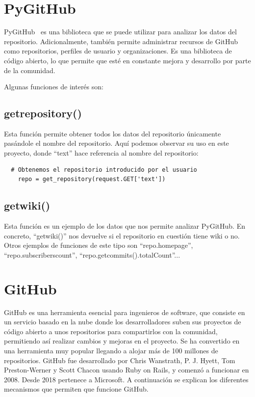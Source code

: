 \documentclass[a4paper, 12pt]{book}
\begin{document}
\section{PyGitHub}
\label{sec:pygithub}

PyGitHub~\cite{website:Pygithub} es una biblioteca que se puede utilizar para analizar los datos del repositorio. Adicionalmente, también permite administrar recursos de GitHub como repositorios, perfiles de usuario y organizaciones. Es una biblioteca de código abierto, lo que permite que esté en constante mejora y desarrollo por parte de la comunidad. 

Algunas funciones de interés son:

\subsection{get\textunderscore repository()}

Esta función permite obtener todos los datos del repositorio únicamente pasándole el nombre del repositorio. Aquí podemos observar su uso en este proyecto, donde ``text'' hace referencia al nombre del repositorio:

 {\footnotesize
\begin{verbatim}
  # Obtenemos el repositorio introducido por el usuario
    repo = get_repository(request.GET['text'])
\end{verbatim}
}

\subsection{get\textunderscore wiki()}

Esta función es un ejemplo de los datos que nos permite analizar PyGitHub. En concreto, ``getwiki()'' nos devuelve si el repositorio en cuestión tiene wiki o no. Otros ejemplos de funciones de este tipo son ``repo.homepage'', ``repo.subscriberscount'', ``repo.getcommits().totalCount''...
\section{GitHub}
\label{sec:github}
GitHub es una herramienta esencial para ingenieros de software, que consiste en un servicio basado en la nube donde los desarrolladores suben sus proyectos de código abierto a unos repositorios para compartirlos con la comunidad, permitiendo así realizar cambios y mejoras en el proyecto. Se ha convertido en una herramienta muy popular llegando a alojar más de 100 millones de repositorios.
GitHub fue desarrollado por Chris Wanstrath, P. J. Hyett, Tom Preston-Werner y Scott Chacon usando Ruby on Rails, y comenzó a funcionar en 2008. Desde 2018 pertenece a Microsoft.
A continuación se explican los diferentes mecanismos que permiten que funcione GitHub.
\end{document}
